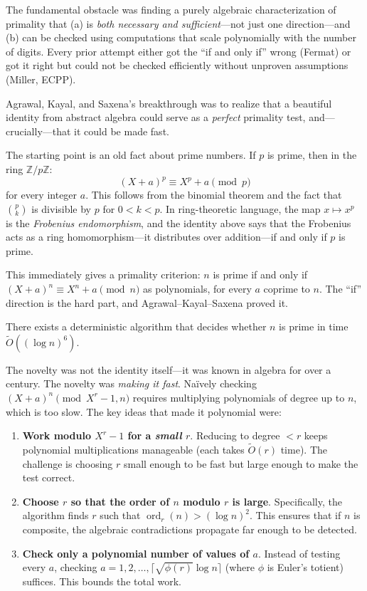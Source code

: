 The fundamental obstacle was finding a purely algebraic characterization of primality that (a) is \emph{both necessary and sufficient}---not just one direction---and (b) can be checked using computations that scale polynomially with the number of digits. Every prior attempt either got the ``if and only if'' wrong (Fermat) or got it right but could not be checked efficiently without unproven assumptions (Miller, ECPP).

Agrawal, Kayal, and Saxena's breakthrough was to realize that a beautiful identity from abstract algebra could serve as a \emph{perfect} primality test, and---crucially---that it could be made fast.

The starting point is an old fact about prime numbers. If $p$ is prime, then in the ring $\mathbb{Z}/p\mathbb{Z}$:
\[
(X + a)^p \equiv X^p + a \pmod{p}
\]
for every integer $a$. This follows from the binomial theorem and the fact that $\binom{p}{k}$ is divisible by $p$ for $0 < k < p$. In ring-theoretic language, the map $x \mapsto x^p$ is the \emph{Frobenius endomorphism}, and the identity above says that the Frobenius acts as a ring homomorphism---it distributes over addition---if and only if $p$ is prime.

This immediately gives a primality criterion: $n$ is prime if and only if $(X+a)^n \equiv X^n + a \pmod{n}$ as polynomials, for every $a$ coprime to $n$. The ``if'' direction is the hard part, and Agrawal--Kayal--Saxena proved it.

\begin{theorem}
There exists a deterministic algorithm that decides whether $n$ is prime in time $\tilde{O}((\log n)^6)$.
\end{theorem}

The novelty was not the identity itself---it was known in algebra for over a century. The novelty was \emph{making it fast}. Na\"ively checking $(X+a)^n \pmod{X^r - 1, n}$ requires multiplying polynomials of degree up to $n$, which is too slow. The key ideas that made it polynomial were:

\begin{enumerate}
\item \textbf{Work modulo $X^r - 1$ for a \emph{small} $r$}. Reducing to degree $< r$ keeps polynomial multiplications manageable (each takes $\tilde{O}(r)$ time). The challenge is choosing $r$ small enough to be fast but large enough to make the test correct.
\item \textbf{Choose $r$ so that the order of $n$ modulo $r$ is large}. Specifically, the algorithm finds $r$ such that $\operatorname{ord}_r(n) > (\log n)^2$. This ensures that if $n$ is composite, the algebraic contradictions propagate far enough to be detected.
\item \textbf{Check only a polynomial number of values of $a$}. Instead of testing every $a$, checking $a = 1, 2, \ldots, \lceil \sqrt{\phi(r)} \log n \rceil$ (where $\phi$ is Euler's totient) suffices. This bounds the total work.
\end{enumerate}

